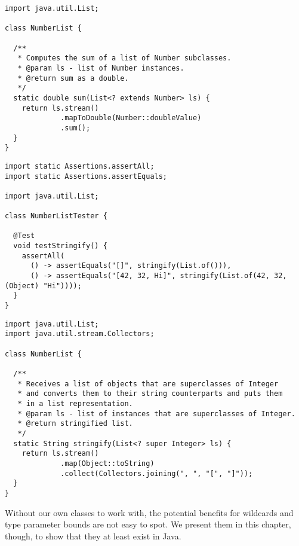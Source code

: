 \begin{lstlisting}[language=MyJava]
import java.util.List;

class NumberList {

  /**
   * Computes the sum of a list of Number subclasses.
   * @param ls - list of Number instances.
   * @return sum as a double.
   */
  static double sum(List<? extends Number> ls) {
    return ls.stream()
             .mapToDouble(Number::doubleValue)
             .sum();
  }
}
\end{lstlisting}



\begin{lstlisting}[language=MyJava]
import static Assertions.assertAll;
import static Assertions.assertEquals;

import java.util.List;

class NumberListTester {

  @Test
  void testStringify() {
    assertAll(
      () -> assertEquals("[]", stringify(List.of())),
      () -> assertEquals("[42, 32, Hi]", stringify(List.of(42, 32, (Object) "Hi"))));
  }
}
\end{lstlisting}

\begin{lstlisting}[language=MyJava]
import java.util.List;
import java.util.stream.Collectors;

class NumberList {

  /**
   * Receives a list of objects that are superclasses of Integer
   * and converts them to their string counterparts and puts them
   * in a list representation.
   * @param ls - list of instances that are superclasses of Integer.
   * @return stringified list.
   */
  static String stringify(List<? super Integer> ls) {
    return ls.stream()
             .map(Object::toString)
             .collect(Collectors.joining(", ", "[", "]"));
  }
}
\end{lstlisting}

Without our own classes to work with, the potential benefits for wildcards and type parameter bounds are not easy to spot. We present them in this chapter, though, to show that they at least exist in Java. 